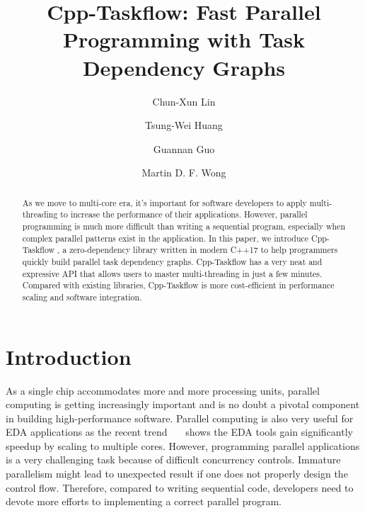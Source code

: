 \documentclass[sigconf]{acmart}
\begin{document}
\sloppy

\fancyhead{}
\title{Cpp-Taskflow: Fast Parallel Programming with Task Dependency Graphs}



\author{Chun-Xun Lin}
%
\author{Tsung-Wei Huang}
%
\author{Guannan Guo}
%
\author{Martin D. F. Wong}





\begin{abstract}
As we move to multi-core era, 
it's important for software developers to apply multi-threading to 
increase the performance of their applications.
However, parallel programming is much more difficult than writing a sequential program, 
especially when complex parallel patterns exist in the application. 
In this paper, we introduce Cpp-Taskflow \cite{cpp-taskflow}, a zero-dependency library 
written in modern C++17 to help programmers 
quickly build parallel task dependency graphs.
Cpp-Taskflow has a very neat and expressive API that allows users to master multi-threading 
in just a few minutes.
Compared with existing libraries, Cpp-Taskflow is more cost-efficient 
in performance scaling and software integration.




\end{abstract}


\maketitle


\section{Introduction}
\label{sec::introduction}
As a single chip accommodates more and more processing units,
parallel computing is getting increasingly important
and is no doubt a pivotal
component in building high-performance software. 
Parallel computing is also very useful for EDA applications as the recent
trend~\cite{routing}~\cite{ot}~\cite{stok}\cite{Lu2018} shows the EDA tools gain significantly speedup
by scaling to multiple cores. 
However, programming parallel applications is a very challenging task
because of difficult concurrency controls.
Immature parallelism might lead to unexpected result if one does not properly
design the control flow.  
Therefore, compared to writing sequential code, developers need to devote 
more efforts to implementing a correct parallel program.
\end{document}
